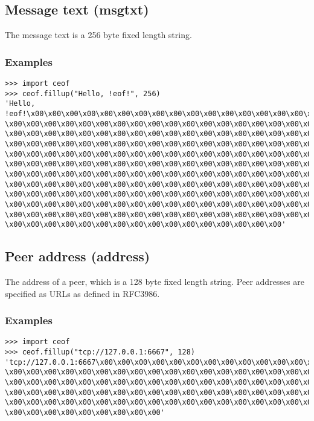 \subsection{Message text (msgtxt)}
The message text is a 256 byte fixed length string.
\subsubsection{Examples}
\begin{verbatim}
>>> import ceof
>>> ceof.fillup("Hello, !eof!", 256)
'Hello, !eof!\x00\x00\x00\x00\x00\x00\x00\x00\x00\x00\x00\x00\x00\x00\x00\x00\x00\x00
\x00\x00\x00\x00\x00\x00\x00\x00\x00\x00\x00\x00\x00\x00\x00\x00\x00\x00\x00\x00\x00
\x00\x00\x00\x00\x00\x00\x00\x00\x00\x00\x00\x00\x00\x00\x00\x00\x00\x00\x00\x00\x00
\x00\x00\x00\x00\x00\x00\x00\x00\x00\x00\x00\x00\x00\x00\x00\x00\x00\x00\x00\x00\x00
\x00\x00\x00\x00\x00\x00\x00\x00\x00\x00\x00\x00\x00\x00\x00\x00\x00\x00\x00\x00\x00
\x00\x00\x00\x00\x00\x00\x00\x00\x00\x00\x00\x00\x00\x00\x00\x00\x00\x00\x00\x00\x00
\x00\x00\x00\x00\x00\x00\x00\x00\x00\x00\x00\x00\x00\x00\x00\x00\x00\x00\x00\x00\x00
\x00\x00\x00\x00\x00\x00\x00\x00\x00\x00\x00\x00\x00\x00\x00\x00\x00\x00\x00\x00\x00
\x00\x00\x00\x00\x00\x00\x00\x00\x00\x00\x00\x00\x00\x00\x00\x00\x00\x00\x00\x00\x00
\x00\x00\x00\x00\x00\x00\x00\x00\x00\x00\x00\x00\x00\x00\x00\x00\x00\x00\x00\x00\x00
\x00\x00\x00\x00\x00\x00\x00\x00\x00\x00\x00\x00\x00\x00\x00\x00\x00\x00\x00\x00\x00
\x00\x00\x00\x00\x00\x00\x00\x00\x00\x00\x00\x00\x00\x00\x00\x00'
\end{verbatim}
\subsection{Peer address (address)}
The address of a peer, which is a 128 byte fixed length string. 
Peer addresses are specified as URLs as defined in RFC3986\cite{rfc3986}. 
\subsubsection{Examples}
\begin{verbatim}
>>> import ceof
>>> ceof.fillup("tcp://127.0.0.1:6667", 128)
'tcp://127.0.0.1:6667\x00\x00\x00\x00\x00\x00\x00\x00\x00\x00\x00\x00\x00\x00\x00
\x00\x00\x00\x00\x00\x00\x00\x00\x00\x00\x00\x00\x00\x00\x00\x00\x00\x00\x00\x00\x00
\x00\x00\x00\x00\x00\x00\x00\x00\x00\x00\x00\x00\x00\x00\x00\x00\x00\x00\x00\x00\x00
\x00\x00\x00\x00\x00\x00\x00\x00\x00\x00\x00\x00\x00\x00\x00\x00\x00\x00\x00\x00\x00
\x00\x00\x00\x00\x00\x00\x00\x00\x00\x00\x00\x00\x00\x00\x00\x00\x00\x00\x00\x00\x00
\x00\x00\x00\x00\x00\x00\x00\x00\x00'
\end{verbatim}
